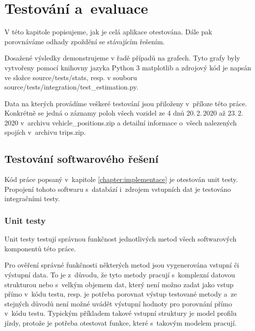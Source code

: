 

\chapter{Testování a~evaluace}


V této kapitole popisujeme, jak je celá aplikace otestována. Dále pak porovnáváme odhady zpoždění se stávajícím řešením.

\bigbreak

Dosažené výsledky demonstrujeme v řadě případů na grafech. Tyto grafy byly vytvořeny pomocí knihovny jazyka Python 3 matplotlib a zdrojový kód je napsán ve složce source/tests/stats, resp. v souboru source/tests/\-integration/\-test\_estimation.py.

\bigbreak

Data na kterých provádíme veškeré testování jsou přiloženy v~příloze této práce. Konkrétně se jedná o záznamy poloh všech vozidel ze 4 dnů 20.\,2.\,2020 až 23.\,2.\,2020 v~archivu vehicle\_positions.zip a detailní informace o~všech nalezených spojích v~archivu trips.zip.

\section{Testování softwarového řešení}

Kód práce popsaný v~kapitole \ref{chapter:implementace} je otestován unit testy. Propojení tohoto softwaru s~databází i~zdrojem vstupních dat je testováno integračními testy.


\subsection{Unit testy}

Unit testy testují správnou funkčnost jednotlivých metod všech softwarových komponentů této práce.

\bigbreak

Pro ověření správné funkčnosti některých metod jsou vygenerována vstupní či výstupní data. To je z~důvodu, že tyto metody pracují s~komplexní datovou strukturou nebo s~velkým objemem dat, který není možno zadat jako vstup přímo v~kódu testu, resp. je potřeba porovnat výstup testované metody a~ze stejných důvodů není možné uvádět výstupní hodnoty pro porovnání přímo v~kódu testu. Typickým příkladem takové vstupní struktury je model profilu jízdy, protože je potřeba otestovat funkce, které s~takovým modelem pracují.

\bigbreak

